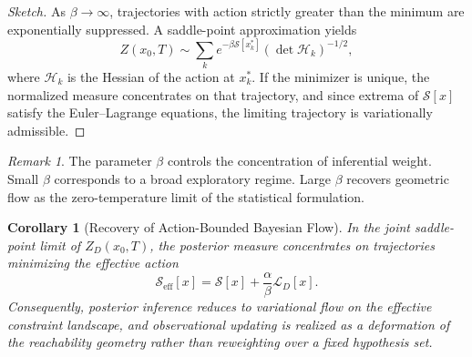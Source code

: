 \documentclass[12pt]{article}
\theoremstyle{plain}
\newtheorem{corollary}[theorem]{Corollary}
\theoremstyle{definition}
\theoremstyle{remark}
\newtheorem{remark}[theorem]{Remark}
\begin{document}
\begin{proof}[Sketch]
As $\beta \to \infty$, trajectories with action strictly greater than the minimum are exponentially suppressed. A saddle-point approximation yields
\[
Z(x_0,T) \sim \sum_k e^{-\beta \mathcal{S}[x^\ast_k]} \left(\det \mathcal{H}_k\right)^{-1/2},
\]
where $\mathcal{H}_k$ is the Hessian of the action at $x^\ast_k$. If the minimizer is unique, the normalized measure concentrates on that trajectory, and since extrema of $\mathcal{S}[x]$ satisfy the Euler--Lagrange equations, the limiting trajectory is variationally admissible.
\end{proof}

\begin{remark}
The parameter $\beta$ controls the concentration of inferential weight. Small $\beta$ corresponds to a broad exploratory regime. Large $\beta$ recovers geometric flow as the zero-temperature limit of the statistical formulation.
\end{remark}

\begin{corollary}[Recovery of Action-Bounded Bayesian Flow]
In the joint saddle-point limit of $Z_D(x_0,T)$, the posterior measure concentrates on trajectories minimizing the effective action
\[
\mathcal{S}_{\mathrm{eff}}[x] = \mathcal{S}[x] + \frac{\alpha}{\beta}\mathcal{L}_D[x].
\]
Consequently, posterior inference reduces to variational flow on the effective constraint landscape, and observational updating is realized as a deformation of the reachability geometry rather than reweighting over a fixed hypothesis set.
\end{corollary}
\end{document}
